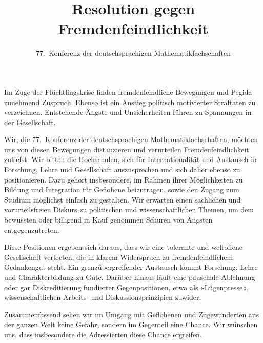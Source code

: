 \documentclass[12pt,a4paper,ngerman,DIV=calc]{scrartcl}
\author{77.~Konferenz der deutschsprachigen
  Mathematikfachschaften}
\title{Resolution gegen Fremdenfeindlichkeit}
\begin{document}
\maketitle{}

Im Zuge der Flüchtlingskrise  finden
fremdenfeindliche Bewegungen und Pegida 
zunehmend Zuspruch. Ebenso ist ein Anstieg politisch motivierter
Straftaten zu verzeichnen. Entstehende Ängste und Unsicherheiten
führen zu Spannungen in der Gesellschaft.

Wir, die 77.~Konferenz der deutschsprachigen Mathematikfachschaften,
möchten uns von diesen Bewegungen distanzieren und verurteilen
Fremdenfeindlichkeit  zutiefst. Wir bitten die
Hochschulen, sich für Internationalität und Austausch in Forschung,
Lehre und Gesellschaft auszusprechen und sich daher ebenso zu
positionieren. Dazu gehört insbesondere, im Rahmen ihrer Möglichkeiten
zu Bildung und Integration für Geflohene beizutragen, sowie den Zugang
zum Studium möglichst  einfach zu gestalten. Wir
erwarten einen sachlichen und vorurteilsfreien Diskurs zu politischen
und wissenschaftlichen Themen, um dem bewussten  oder billigend in Kauf genommen Schüren von Ängsten
entgegenzutreten.

Diese Positionen ergeben sich daraus, dass wir eine tolerante und
weltoffene Gesellschaft vertreten, die in klarem Widerspruch zu
fremdenfeindlichem Gedankengut steht. Ein
grenzübergreifender  Austausch kommt Forschung, Lehre und
Charakterbildung zu Gute. Darüber hinaus läuft eine pauschale
Ablehnung oder gar Diskreditierung fundierter Gegenpositionen, etwa
als »Lügenpresse«, wissenschaftlichen Arbeits- und
Diskussionsprinzipien zuwider.

Zusammenfassend sehen wir im Umgang mit Geflohenen und Zugewanderten
aus der ganzen Welt keine Gefahr, sondern im Gegenteil eine
Chance. Wir wünschen uns, dass insbesondere die Adressierten diese
Chance ergreifen.
\end{document}
